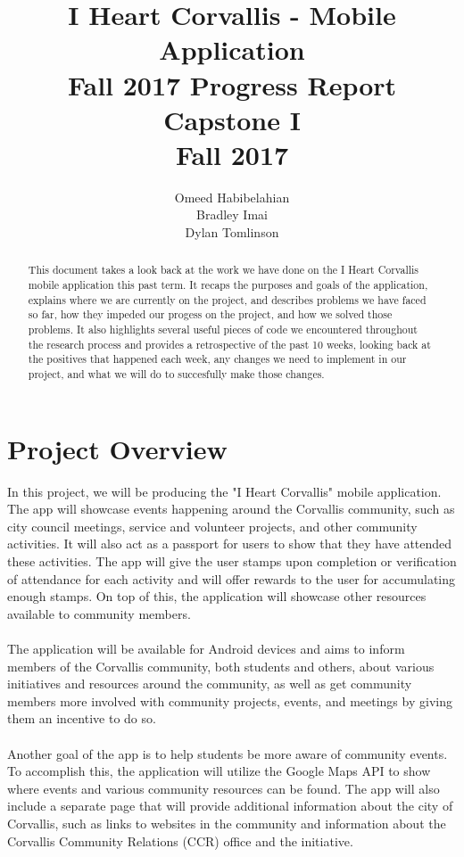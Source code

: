\documentclass[draftclsnofoot, onecolumn, 10pt, compsoc]{IEEEtran}
\title{\textbf{I Heart Corvallis - Mobile Application
               \\Fall 2017 Progress Report}
               \\Capstone I
               \\Fall 2017}
\author{Omeed Habibelahian\\Bradley Imai\\Dylan Tomlinson}
\begin{document}
   \maketitle
   \begin{abstract}
      This document takes a look back at the work we have done on the I Heart Corvallis mobile application this past term. It recaps the purposes and goals of the application, explains where we are currently on the project, and describes problems we have faced so far, how they impeded our progess on the project, and how we solved those problems. It also highlights several useful pieces of code we encountered throughout the research process and provides a retrospective of the past 10 weeks, looking back at the positives that happened each week, any changes we need to implement in our project, and what we will do to succesfully make those changes.
   \end{abstract}
   \newpage

   \tableofcontents
   \newpage

   \section{Project Overview}
   In this project, we will be producing the "I Heart Corvallis" mobile application. The app will showcase events happening around the Corvallis community, such as city council meetings, service and volunteer projects, and other community activities. It will also act as a passport for users to show that they have attended these activities. The app will give the user stamps upon completion or verification of attendance for each activity and will offer rewards to the user for accumulating enough stamps. On top of this, the application will showcase other resources available to community members. \\ \\
   The application will be available for Android devices and aims to inform members of the Corvallis community, both students and others, about various initiatives and resources around the community, as well as get community members more involved with community projects, events, and meetings by giving them an incentive to do so. \\ \\
   Another goal of the app is to help students be more aware of community events. To accomplish this, the application will utilize the Google Maps API to show where events and various community resources can be found. The app will also include a separate page that will provide additional information about the city of Corvallis, such as links to websites in the community and information about the Corvallis Community Relations (CCR) office and the initiative.
\end{document}
